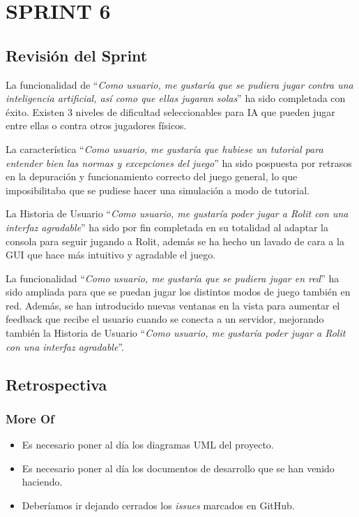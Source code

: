 \documentclass[../../SCRUM.tex]{subfiles}
\begin{document}
\section{SPRINT 6}
\subsection{Revisión del Sprint}
La funcionalidad de ``\textit{Como usuario, me gustaría que se pudiera jugar contra una inteligencia artificial, así como que ellas jugaran solas}'' ha sido completada con éxito. Existen 3 niveles de dificultad seleccionables para IA que pueden jugar entre ellas o contra otros jugadores físicos.

La característica ``\textit{Como usuario, me gustaría que hubiese un tutorial para entender bien las normas y excepciones del juego}'' ha sido pospuesta por retrasos en la depuración y funcionamiento correcto del juego general, lo que imposibilitaba que se pudiese hacer una simulación a modo de tutorial.

La Historia de Usuario ``\textit{Como usuario, me gustaría poder jugar a Rolit con una interfaz agradable}'' ha sido por fin completada en su totalidad al adaptar la consola para seguir jugando a Rolit, además se ha hecho un lavado de cara a la GUI que hace más intuitivo y agradable el juego.

La funcionalidad ``\textit{Como usuario, me gustaría que se pudiera jugar en red}'' ha sido ampliada para que se puedan jugar los distintos modos de juego también en red. Además, se han introducido nuevas ventanas en la vista para aumentar el feedback que recibe el usuario cuando se conecta a un servidor, mejorando también la Historia de Usuario ``\textit{Como usuario, me gustaría poder jugar a Rolit con una interfaz agradable}''.

\subsection{Retrospectiva}
\subsubsection*{More Of}
\begin{itemize}
\item Es necesario poner al día los diagramas UML del proyecto.
\item Es necesario poner al día los documentos de desarrollo que se han venido haciendo.
\item Deberíamos ir dejando cerrados los \textit{issues} marcados en GitHub.
\end{itemize}
\end{document}
